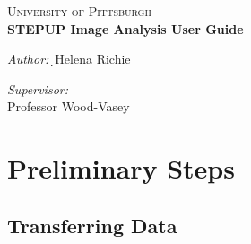 \documentclass[11pt]{report}
\begin{document}
\begin{titlepage}
\begin{center}
\textsc{\LARGE University of Pittsburgh}\\[1.5cm]
{\huge \bfseries STEPUP Image Analysis User Guide\\[0.4cm] }

\vfill
\begin{minipage}{0.4\textwidth}
\begin{flushleft}\large
\emph{Author:}\d\
Helena Richie
\end{flushleft}
\end{minipage}
\begin{minipage}{0.4\textwidth}
\begin{flushright} \large
\emph{Supervisor:} \\
Professor Wood-Vasey
\end{flushright}
\end{minipage}

\end{center}
\end{titlepage}
\tableofcontents
\chapter{Preliminary Steps}

\section{Transferring Data}
\end{document}
